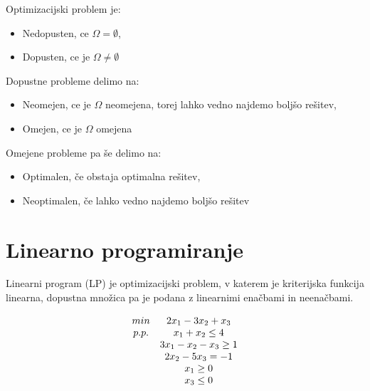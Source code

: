 \documentclass[11pt, a4paper]{article}
\begin{document}
    \par
    Optimizacijski problem je:
    \begin{itemize}
        \item Nedopusten, ce \(\Omega = \emptyset\),
        \item Dopusten, ce je \(\Omega \neq \emptyset\)
        
    \end{itemize}

    \par
    Dopustne probleme delimo na:
    \begin{itemize}
        \item Neomejen, ce je \(\Omega\) neomejena, torej lahko vedno najdemo boljšo rešitev,
        \item Omejen, ce je \(\Omega\) omejena
        
    \end{itemize}

    \par
    Omejene probleme pa še delimo na:
    \begin{itemize}
        \item Optimalen, če obstaja optimalna rešitev,
        \item Neoptimalen, če lahko vedno najdemo boljšo rešitev
    \end{itemize}



    \section{Linearno programiranje}

    \begin{definition}
        Linearni program (LP) je optimizacijski problem, v katerem je kriterijska funkcija linearna, dopustna množica pa je podana z linearnimi enačbami in neenačbami.
    \end{definition}

    \begin{example}
        \[
            \begin{array}{ c c }
                min & 2x_1-3x_2+x_3 \\
                p.p. & x_1+x_2 \le 4 \\
                & 3x_1-x_2-x_3 \ge 1 \\
                & 2x_2-5x_3 = -1 \\
                & x_1 \ge 0 \\
                & x_3 \le 0 \\
            \end{array}
        \]
    \end{example}
    
\end{document}
